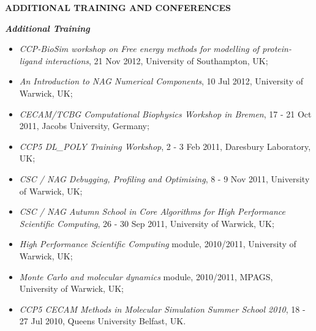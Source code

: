 \documentclass[a4paper,11pt,final]{memoir}
\newcommand{\Sep}{\vspace{1.em}}
\newcommand{\SmallSep}{\vspace{0.2em}}
\newcommand{\CVSection}[1]
	{\Large\textbf{#1}\par
	\SmallSep\normalsize\normalfont}
\newcommand{\CVItem}[2]
	{\textit{\textbf{\color{RoyalBlue} #1}} #2}
\begin{document}
\Sep
\CVSection{ADDITIONAL TRAINING AND CONFERENCES} 
\CVItem{Additional Training} 
\begin{itemize} \itemsep -1.5pt %
\item \textit{CCP-BioSim workshop on Free energy methods for modelling of protein-ligand
  interactions}, 21 Nov 2012, University of Southampton, UK;
\item \textit{An Introduction to NAG Numerical Components}, 10 Jul 2012, University of Warwick, UK;
\item \textit{CECAM/TCBG Computational Biophysics Workshop in Bremen},  17 - 21 Oct 2011, Jacobs University, Germany;  
\item \textit{CCP5 DL\_POLY Training Workshop}, 2 - 3 Feb 2011, Daresbury
Laboratory, UK;
\item \textit{CSC / NAG Debugging, Profiling and Optimising},  8 - 9 Nov 2011, University of
  Warwick, UK;
\item \textit{CSC / NAG Autumn School in Core Algorithms for High Performance Scientific
  Computing}, 26 - 30 Sep 2011, University of Warwick, UK;
\item \textit{High Performance Scientific Computing} module, 2010/2011, University of Warwick, UK;
\item \textit{Monte Carlo and molecular dynamics} module, 2010/2011, MPAGS, University of Warwick, UK;
\item \textit{CCP5 CECAM Methods in Molecular Simulation Summer School 2010}, 18 - 27 Jul 2010, Queens University
  Belfast, UK.
\end{itemize}
\SmallSep
\end{document}
